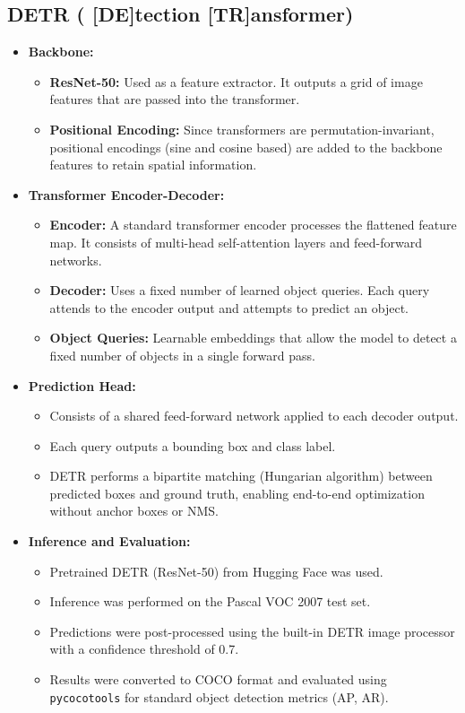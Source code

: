 \documentclass[12pt,a4paper]{article}
\begin{document}
\subsection{DETR ( [DE]tection [TR]ansformer)}
\begin{itemize}
    \item \textbf{Backbone:}
        \begin{itemize}
            \item \textbf{ResNet-50:} Used as a feature extractor. It outputs a grid of image features that are passed into the transformer.
            \item \textbf{Positional Encoding:} Since transformers are permutation-invariant, positional encodings (sine and cosine based) are added to the backbone features to retain spatial information.
        \end{itemize}
        
    \item \textbf{Transformer Encoder-Decoder:}
        \begin{itemize}
            \item \textbf{Encoder:} A standard transformer encoder processes the flattened feature map. It consists of multi-head self-attention layers and feed-forward networks.
            \item \textbf{Decoder:} Uses a fixed number of learned object queries. Each query attends to the encoder output and attempts to predict an object.
            \item \textbf{Object Queries:} Learnable embeddings that allow the model to detect a fixed number of objects in a single forward pass.
        \end{itemize}
        
    \item \textbf{Prediction Head:}
        \begin{itemize}
            \item Consists of a shared feed-forward network applied to each decoder output.
            \item Each query outputs a bounding box and class label.
            \item DETR performs a bipartite matching (Hungarian algorithm) between predicted boxes and ground truth, enabling end-to-end optimization without anchor boxes or NMS.
        \end{itemize}

    \item \textbf{Inference and Evaluation:}
        \begin{itemize}
            \item Pretrained DETR (ResNet-50) from Hugging Face was used.
            \item Inference was performed on the Pascal VOC 2007 test set.
            \item Predictions were post-processed using the built-in DETR image processor with a confidence threshold of 0.7.
            \item Results were converted to COCO format and evaluated using \texttt{pycocotools} for standard object detection metrics (AP, AR).
        \end{itemize}
\end{itemize}
\end{document}
